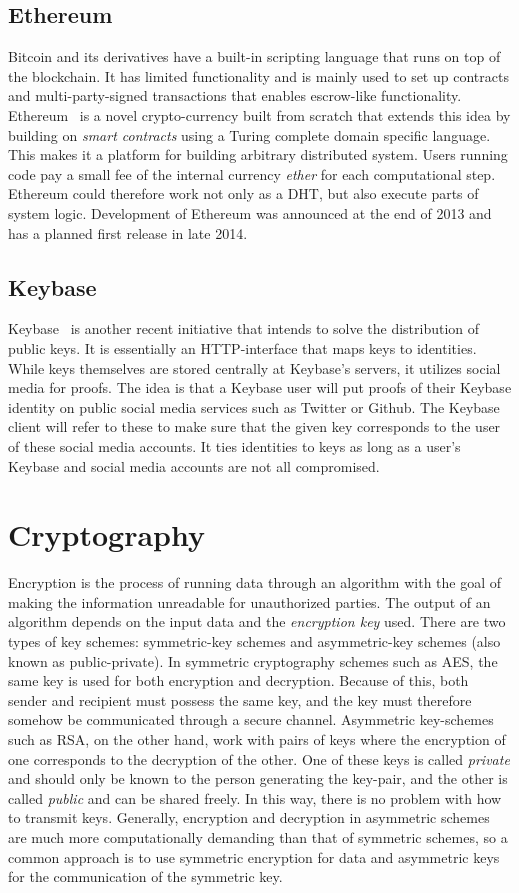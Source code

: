 \subsection{Ethereum}
Bitcoin and its derivatives have a built-in scripting language that runs on top of the blockchain. It has limited functionality and is mainly used to set up contracts and multi-party-signed transactions that enables escrow-like functionality. Ethereum~\cite{Ethereum:Online} is a novel crypto-currency built from scratch that extends this idea by building on \emph{smart contracts} using a Turing complete domain specific language. This makes it a platform for building arbitrary distributed system. Users running code pay a small fee of the internal currency \emph{ether} for each computational step. Ethereum could therefore work not only as a DHT, but also execute parts of system logic. Development of Ethereum was announced at the end of 2013 and has a planned first release in late 2014.

\subsection{Keybase}
Keybase~\cite{Keybase:Online} is another recent initiative that intends to solve the distribution of public keys. It is essentially an HTTP-interface that maps keys to identities. While keys themselves are stored centrally at Keybase's servers, it utilizes social media for proofs. The idea is that a Keybase user will put proofs of their Keybase identity on public social media services such as Twitter or Github. The Keybase client will refer to these to make sure that the given key corresponds to the user of these social media accounts. It ties identities to keys as long as a user's Keybase and social media accounts are not all compromised.

\section{Cryptography}
\label{sec:techcryptography}
Encryption is the process of running data through an algorithm with the goal of making the information unreadable for unauthorized parties. The output of an algorithm depends on the input data and the \emph{encryption key} used. There are two types of key schemes: symmetric-key schemes and asymmetric-key schemes (also known as public-private). In symmetric cryptography  schemes such as AES, the same key is used for both encryption and decryption. Because of this, both sender and recipient must possess the same key, and the key must therefore somehow be communicated through a secure channel. Asymmetric key-schemes such as RSA, on the other hand, work with pairs of keys where the encryption of one corresponds to the decryption of the other. One of these keys is called \emph{private} and should only be known to the person generating the key-pair, and the other is called \emph{public} and can be shared freely. In this way, there is no problem with how to transmit keys. Generally, encryption and decryption in asymmetric schemes are much more computationally demanding than that of symmetric schemes, so a common approach is to use symmetric encryption for data and asymmetric keys for the communication of the symmetric key.

